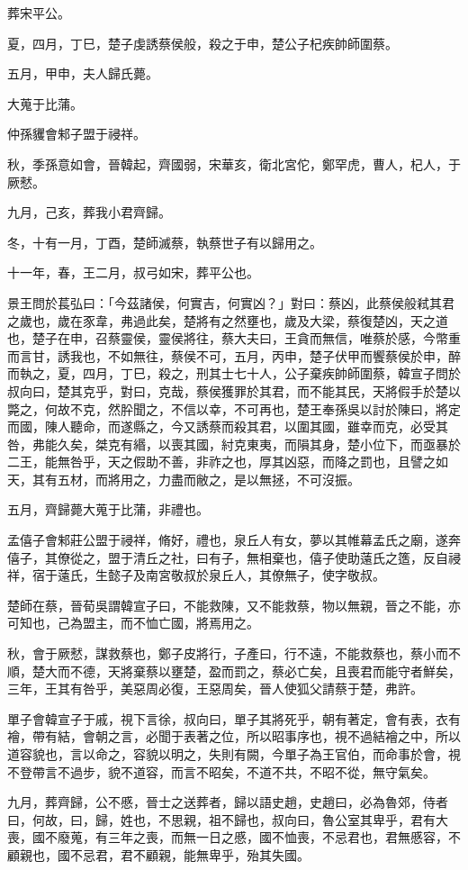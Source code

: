 \begin{pinyinscope}
葬宋平公。

夏，四月，丁巳，楚子虔誘蔡侯般，殺之于申，楚公子杞疾帥師圍蔡。

五月，甲申，夫人歸氏薨。

大蒐于比蒲。

仲孫貜會邾子盟于祲祥。

秋，季孫意如會，晉韓起，齊國弱，宋華亥，衛北宮佗，鄭罕虎，曹人，杞人，于厥憖。

九月，己亥，葬我小君齊歸。

冬，十有一月，丁酉，楚師滅蔡，執蔡世子有以歸用之。

十一年，春，王二月，叔弓如宋，葬平公也。

景王問於萇弘曰：「今茲諸侯，何實吉，何實凶？」對曰：蔡凶，此蔡侯般弒其君之歲也，歲在豕韋，弗過此矣，楚將有之然壅也，歲及大梁，蔡復楚凶，天之道也，楚子在申，召蔡靈侯，靈侯將往，蔡大夫曰，王貪而無信，唯蔡於感，今幣重而言甘，誘我也，不如無往，蔡侯不可，五月，丙申，楚子伏甲而饗蔡侯於申，醉而執之，夏，四月，丁巳，殺之，刑其士七十人，公子棄疾帥師圍蔡，韓宣子問於叔向曰，楚其克乎，對曰，克哉，蔡侯獲罪於其君，而不能其民，天將假手於楚以斃之，何故不克，然肸聞之，不信以幸，不可再也，楚王奉孫吳以討於陳曰，將定而國，陳人聽命，而遂縣之，今又誘蔡而殺其君，以圍其國，雖幸而克，必受其咎，弗能久矣，桀克有緡，以喪其國，紂克東夷，而隕其身，楚小位下，而亟暴於二王，能無咎乎，天之假助不善，非祚之也，厚其凶惡，而降之罰也，且譬之如天，其有五材，而將用之，力盡而敝之，是以無拯，不可沒振。

五月，齊歸薨大蒐于比蒲，非禮也。

孟僖子會邾莊公盟于祲祥，脩好，禮也，泉丘人有女，夢以其帷幕孟氏之廟，遂奔僖子，其僚從之，盟于清丘之社，曰有子，無相棄也，僖子使助薳氏之簉，反自祲祥，宿于薳氏，生懿子及南宮敬叔於泉丘人，其僚無子，使字敬叔。

楚師在蔡，晉荀吳謂韓宣子曰，不能救陳，又不能救蔡，物以無親，晉之不能，亦可知也，己為盟主，而不恤亡國，將焉用之。

秋，會于厥憖，謀救蔡也，鄭子皮將行，子產曰，行不遠，不能救蔡也，蔡小而不順，楚大而不德，天將棄蔡以壅楚，盈而罰之，蔡必亡矣，且喪君而能守者鮮矣，三年，王其有咎乎，美惡周必復，王惡周矣，晉人使狐父請蔡于楚，弗許。

單子會韓宣子于戚，視下言徐，叔向曰，單子其將死乎，朝有著定，會有表，衣有襘，帶有結，會朝之言，必聞于表著之位，所以昭事序也，視不過結襘之中，所以道容貌也，言以命之，容貌以明之，失則有闕，今單子為王官伯，而命事於會，視不登帶言不過步，貌不道容，而言不昭矣，不道不共，不昭不從，無守氣矣。

九月，葬齊歸，公不慼，晉士之送葬者，歸以語史趙，史趙曰，必為魯郊，侍者曰，何故，曰，歸，姓也，不思親，祖不歸也，叔向曰，魯公室其卑乎，君有大喪，國不廢蒐，有三年之喪，而無一日之慼，國不恤喪，不忌君也，君無慼容，不顧親也，國不忌君，君不顧親，能無卑乎，殆其失國。


\end{pinyinscope}
